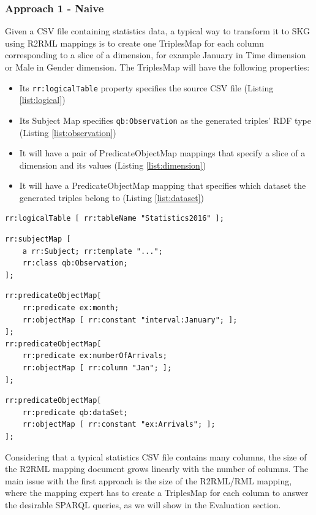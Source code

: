 \subsubsection{Approach 1 - Naive}
Given a CSV file containing statistics data, a typical way to transform it to SKG using R2RML mappings is to create one TriplesMap for each column corresponding to a slice of a dimension, for example January in Time dimension or Male in Gender dimension. The TriplesMap will have the following properties:
\begin{itemize}
\item Its \texttt{rr:logicalTable} property specifies the source CSV file (Listing \ref{list:logical})
\item Its Subject Map specifies \texttt{qb:Observation} as the generated triples’ RDF type (Listing \ref{list:observation})
\item It will have a pair of PredicateObjectMap mappings that specify a slice of a dimension and its values (Listing \ref{list:dimension})
\item It will have a PredicateObjectMap mapping that specifies which dataset the generated triples belong to (Listing \ref{list:dataset})
\end{itemize}
\lstset{upquote=true}
\begin{lstlisting}[float,caption=Data source mapping,frame=tlrb,label={list:logical}, columns=fullflexible]
rr:logicalTable [ rr:tableName "Statistics2016" ];
\end{lstlisting}

\begin{lstlisting}[float,caption=Observation mapping,frame=tlrb,label={list:observation}, columns=fullflexible]
rr:subjectMap [ 
    a rr:Subject; rr:template "..."; 
    rr:class qb:Observation; 
];
\end{lstlisting}

\begin{lstlisting}[float,caption=Dimension slice mapping,frame=tlrb,label={list:dimension}, columns=fullflexible]
rr:predicateObjectMap[ 
    rr:predicate ex:month; 
    rr:objectMap [ rr:constant "interval:January"; ];  
];
rr:predicateObjectMap[ 
    rr:predicate ex:numberOfArrivals; 
    rr:objectMap [ rr:column "Jan"; ]; 
];
\end{lstlisting}

\begin{lstlisting}[float,caption=Dataset mapping,frame=tlrb,label={list:dataset}, columns=fullflexible]
rr:predicateObjectMap[ 
    rr:predicate qb:dataSet; 
    rr:objectMap [ rr:constant "ex:Arrivals"; ];
];
\end{lstlisting}
\lstset{upquote=false}
Considering that a typical statistics CSV file contains many columns, the size of the R2RML mapping document grows linearly with the number of columns. The main issue with the first approach is the size of the R2RML/RML mapping, where the mapping expert has to create a TriplesMap for each column to answer the desirable SPARQL queries, as we will show in the Evaluation section.

